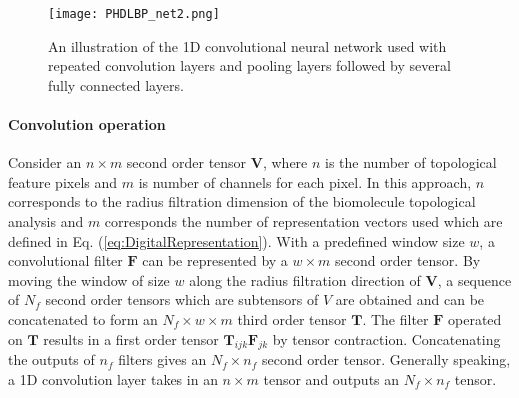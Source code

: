 \documentclass[10pt]{article}
\begin{document}
\begin{figure}[ht]
\begin{center}
\texttt{[image: PHDLBP\_net2.png]}
\caption{An illustration of the 1D convolutional neural network used with repeated convolution layers and pooling layers followed by several fully connected layers.}
\label{sup:Figure_PHDLBP_net}
\end{center}
\end{figure}








\paragraph{Convolution operation}




Consider an $n\times m$ second order tensor $\mathbf{V}$, where $n$ is the number of  topological feature pixels and $m$ is number of channels for each pixel. In this approach, $n$ corresponds to the radius filtration dimension of the biomolecule topological analysis and $m$ corresponds the number of representation vectors used which are defined in Eq. (\ref{eq:DigitalRepresentation}). With a predefined window size $w$, a convolutional filter $\mathbf{F}$ can be represented by a $w\times m$ second order tensor. By moving the window of size $w$ along the  radius filtration direction of $\mathbf{V}$, a sequence of $N_f$ second order tensors which are subtensors of $V$ are obtained and can be concatenated to form an $N_f\times w\times m$ third order tensor $\mathbf{T}$. The filter $\mathbf{F}$ operated on $\mathbf{T}$ results in a first order tensor $\mathbf{T}_{ijk}\mathbf{F}_{jk}$ by tensor contraction. Concatenating the outputs of $n_f$ filters gives an $N_f\times n_f$ second order tensor. Generally speaking, a 1D convolution layer takes in an $n\times m$ tensor and outputs an $N_f\times n_f$ tensor. 
\end{document}
